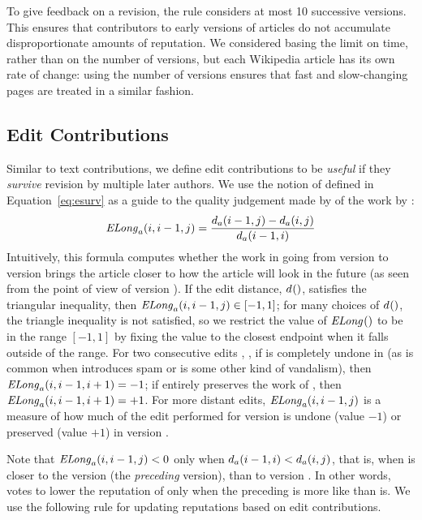 To give feedback on a revision, the rule considers at most 10
successive versions.
This ensures that contributors to early versions of articles do not
accumulate disproportionate amounts of reputation.
We considered basing the limit on time, rather than on the number of
versions, but each Wikipedia article has its own rate of change:
using the number of versions ensures that fast and
slow-changing pages are treated in a similar fashion.

\subsection{Edit Contributions}

Similar to text contributions, we define edit contributions to
be \textit{useful} if they \textit{survive} revision by multiple
later authors.
We use the notion of  defined in
Equation~\ref{eq:esurv} as a guide to the quality judgement
made by  of the work by :
\begin{equation*}
\mathit{ELong}_{a}(i,i-1,j) = \frac{d_{a}(i-1,j) - d_{a}(i,j)}
                        {d_{a}(i-1,i)}
\end{equation*}
Intuitively, this formula computes whether the work in going
from version  to version  brings the
article closer to how the article will look in the future
(as seen from the point of view of version ).
If the edit distance, $d_{}()$,
satisfies the triangular inequality,
then $\mathit{ELong}_{a}(i,i-1,j) \in [-1,1]$; for many choices of $d_{}()$,
the triangle inequality is not satisfied, so
we restrict the value of $\mathit{ELong}_{}()$ to be in the range $[-1,1]$
by fixing the value to the closest endpoint when
it falls outside of the range.
For two consecutive edits , ,
if  is completely undone in 
(as is common when  introduces spam or is some other
kind of vandalism), then $\mathit{ELong}_{a}(i,i-1,i+1) = -1$;
if  entirely preserves the work of ,
then $\mathit{ELong}_{a}(i,i-1,i+1) = +1$.
For more distant edits, $\mathit{ELong}_{a}(i,i-1,j)$ is a measure of how much of the
edit performed for version 
is undone (value $-1$) or preserved (value $+1$) in version .

Note that $\mathit{ELong}_{a}(i,i-1,j) < 0$
only when
$d_{a}(i-1,i) < d_{a}(i,j)$,
that is,
when  is closer to the version 
(the \textit{preceding} version), than to version .
In other words, 
votes to lower the reputation of 
only when the preceding  is more like 
than  is.
We use the following rule for updating reputations based on
edit contributions.

